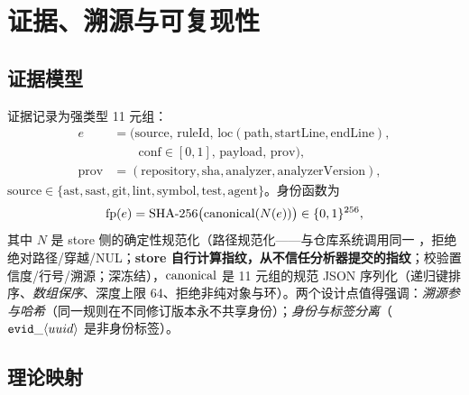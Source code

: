 \chapter{证据、溯源与可复现性}\label{ch:evidence}

\section{证据模型}

证据记录为强类型 11 元组：
\begin{align}
e&=\bigl(\text{source},\,\text{ruleId},\,\text{loc}(\text{path},\text{startLine},\text{endLine}),\nonumber\\
&\qquad\text{conf}\in[0,1],\,\text{payload},\,\mathrm{prov}\bigr),\\
\mathrm{prov}&=(\text{repository},\text{sha},\text{analyzer},\text{analyzerVersion}),
\end{align}
$\text{source}\in\{\text{ast},\text{sast},\text{git},\text{lint},\text{symbol},\text{test},\text{agent}\}$。身份函数为
\begin{equation}
\operatorname{fp}(e)=\mathrm{SHA\text{-}256}\bigl(\operatorname{canonical}(N(e))\bigr)\in\{0,1\}^{256},
\end{equation}
其中 $N$ 是 store 侧的确定性规范化（路径规范化——与仓库系统调用同一 ，拒绝绝对路径/穿越/NUL；\textbf{store 自行计算指纹，从不信任分析器提交的指纹}；校验置信度/行号/溯源；深冻结），$\operatorname{canonical}$ 是 11 元组的规范 JSON 序列化（递归键排序、\emph{数组保序}、深度上限 64、拒绝非纯对象与环）。两个设计点值得强调：\emph{溯源参与哈希}（同一规则在不同修订版本永不共享身份）；\emph{身份与标签分离}（$\texttt{evid}\_\langle uuid\rangle$ 是非身份标签）。

\section{理论映射}

